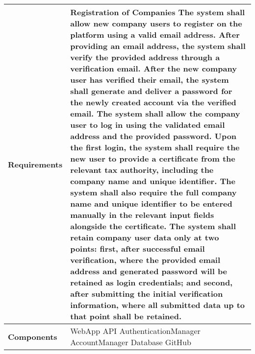 \begin{table}[H]
    \centering
    \renewcommand{\arraystretch}{1.5} %
    \begin{tabular}{|C{0.3\textwidth}|L{0.65\textwidth}|} %
        \hline
        \textbf{Requirements} &    
         \textbf{Registration of Companies}
         \newline
        [FR4] The system shall allow new company users to register on the platform using a valid email address.
        \newline
        [FR5] After providing an email address, the system shall verify the provided address through a verification email. 
        \newline
        [FR6] After the new company user has verified their email, the system shall generate and deliver a password for the newly created account via the verified email. 
        \newline
        [FR7] The system shall allow the company user to log in using the validated email address and the provided password. 
        \newline
        [FR8] Upon the first login, the system shall require the new user to provide a certificate from the relevant tax authority, including the company name and unique identifier. The system shall also require the full company name and unique identifier to be entered manually in the relevant input fields alongside the certificate. 
        \newline
        [FR9] The system shall retain company user data only at two points: first, after successful email verification, where the provided email address and generated password will be retained as login credentials; and second, after submitting the initial verification information, where all submitted data up to that point shall be retained. 
        \\
        \hline
        \textbf{Components} & WebApp \newline API \newline AuthenticationManager \newline AccountManager \newline Database \newline GitHub \\
        \hline
    \end{tabular}
\end{table}

